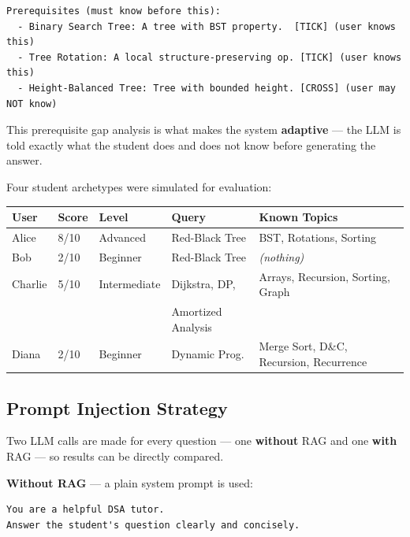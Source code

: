 \documentclass[12pt,a4paper]{article}
\begin{document}
\begin{lstlisting}
Prerequisites (must know before this):
  - Binary Search Tree: A tree with BST property.  [TICK] (user knows this)
  - Tree Rotation: A local structure-preserving op. [TICK] (user knows this)
  - Height-Balanced Tree: Tree with bounded height. [CROSS] (user may NOT know)
\end{lstlisting}

This prerequisite gap analysis is what makes the system \textbf{adaptive} ---
the LLM is told exactly what the student does and does not know before
generating the answer.

Four student archetypes were simulated for evaluation:

\begin{center}
\begin{tabularx}{\textwidth}{llllX}
  \toprule
  \textbf{User} & \textbf{Score} & \textbf{Level} & \textbf{Query} &
  \textbf{Known Topics} \\
  \midrule
  Alice   & 8/10 & Advanced     & Red-Black Tree   & BST, Rotations, Sorting \\
  Bob     & 2/10 & Beginner     & Red-Black Tree   & \textit{(nothing)} \\
  Charlie & 5/10 & Intermediate & Dijkstra, DP,    & Arrays, Recursion, Sorting,
                                                     Graph \\
          &      &              & Amortized Analysis & \\
  Diana   & 2/10 & Beginner     & Dynamic Prog.    & Merge Sort, D\&C,
                                                     Recursion, Recurrence \\
  \bottomrule
\end{tabularx}
\end{center}

\subsection{Prompt Injection Strategy}

Two LLM calls are made for every question --- one \textbf{without} RAG and one
\textbf{with} RAG --- so results can be directly compared.

\textbf{Without RAG} --- a plain system prompt is used:

\begin{lstlisting}
You are a helpful DSA tutor.
Answer the student's question clearly and concisely.
\end{lstlisting}
\end{document}
